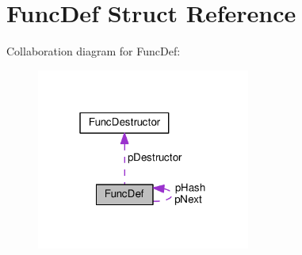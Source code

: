 \hypertarget{structFuncDef}{}\section{Func\+Def Struct Reference}
\label{structFuncDef}


Collaboration diagram for Func\+Def\+:\nopagebreak
\begin{figure}[H]
\begin{center}
\leavevmode
\includegraphics[width=199pt]{structFuncDef__coll__graph}
\end{center}
\end{figure}
